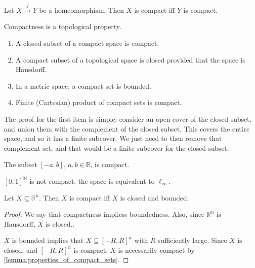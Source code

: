 \documentclass[notoc,notitlepage]{tufte-book}
\begin{document}
\begin{crly}\label{crly:homeomorphic_maps_map_compact_sets_to_compact_sets}
  Let $X \overset{f}{\to} Y$ be a homeomorphism. Then $X$ is compact iff
  $Y$ is compact.
\end{crly}

\begin{note}
  Compactness is a topological property.
\end{note}

\begin{lemma}\label{lemma:properties_of_compact_sets}
  \begin{enumerate}
    \item A closed subset of a compact space is compact.
    \item A compact subset of a topological space is closed provided that the
      space is Hausdorff.
    \item In a metric space, a compact set is bounded.
    \item Finite (Cartesian) product of compact sets is compact.
  \end{enumerate}
\end{lemma}

The proof for the first item is simple: consider an open cover of the closed subset,
and union them with the complement of the closed subset. This covers the entire space,
and so it has a finite subcover. We just need to then remove that complement set, and
that would be a finite subcover for the closed subset.

\begin{eg}
  The subset $[-a, b]$, $a, b \in \mathbb{R}$, is compact.
\end{eg}

\begin{eg}
  $[0, 1]^{\mathbb{N}}$ is not compact: the space is equivalent to $\ell_\infty$.
\end{eg}

\begin{thm}\label{thm:heine_borel}
  Let $X \subseteq \mathbb{R}^n$. Then $X$ is compact iff $X$ is closed and bounded.
\end{thm}

\begin{proof}
  \hlbnoted{$(\implies)$} We say that compactness impliess boundedness. Also, since
  $\mathbb{R}^n$ is Hausdorff, $X$ is closed..

  \noindent
  \hlbnoted{$(\impliedby)$} $X$ is bounded implies that $X \subseteq [-R, R]^n$ with $R$
  sufficiently large. Since $X$ is closed, and $[-R, R]^n$ is compact, $X$ is necessarily
  compact by \cref{lemma:properties_of_compact_sets}.
\end{proof}
\end{document}
